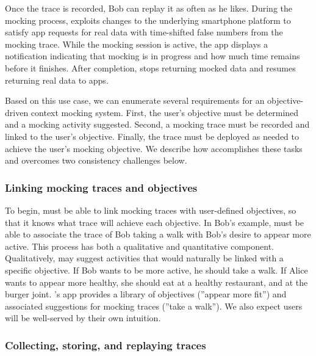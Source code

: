 Once the trace is recorded, Bob can replay it as often as he likes. During the
mocking process, \PocketMocker{} exploits changes to the underlying
smartphone platform to satisfy app requests for real data with time-shifted
false numbers from the mocking trace. While the mocking session is active, the
\PocketMocker{} app displays a notification indicating that mocking is in
progress and how much time remains before it finishes. After completion,
\PocketMocker{} stops returning mocked data and resumes returning real data to
apps.

Based on this use case, we can enumerate several requirements for an
objective-driven context mocking system. First, the user's objective must be
determined and a mocking activity suggested. Second, a mocking trace must be
recorded and linked to the user's objective. Finally, the trace must be
deployed as needed to achieve the user's mocking objective. We describe how
\PocketMocker{} accomplishes these tasks and overcomes two consistency
challenges below.

\subsubsection{Linking mocking traces and objectives}

To begin, \PocketMocker{} must be able to link mocking traces with
user-defined objectives, so that it knows what trace will achieve each
objective. In Bob's example, \PocketMocker{} must be able to associate the
trace of Bob taking a walk with Bob's desire to appear more active. This
process has both a qualitative and quantitative component. Qualitatively,
\PocketMocker{} may suggest activities that would naturally be linked with a
specific objective. If Bob wants to be more active, he should take a walk. If
Alice wants to appear more healthy, she should eat at a healthy restaurant,
and at the burger joint. \PocketMocker{}'s app provides a library of
objectives (''appear more fit'') and associated suggestions for mocking
traces (''take a walk''). We also expect users will be well-served by their
own intuition.

\subsubsection{Collecting, storing, and replaying traces}

